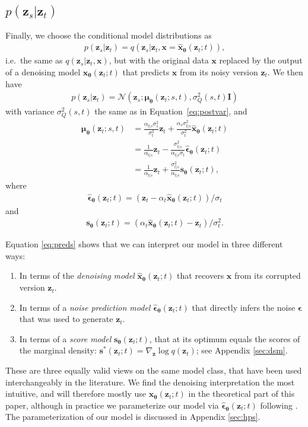 \documentclass{article}
\def\Eqref#1{Equation~\ref{#1}}
\def\rvx{{\mathbf{x}}}
\def\rvz{{\mathbf{z}}}
\newcommand{\bT}{{\boldsymbol{\theta}}}
\newcommand{\snT}{\mathbf{s}_{\bT}}
\newcommand{\bfI}{\mathbf{I}}
\newcommand{\bepsilon}{{\boldsymbol{\epsilon}}}
\newcommand{\bmu}{{\boldsymbol{\mu}}}
\begin{document}
\subsection{$p(\rvz_s|\rvz_t)$}
Finally, we choose the conditional model distributions as
\begin{align}
p(\rvz_s|\rvz_t) = q(\rvz_s|\rvz_t, \rvx=\hat{\rvx}_{\bT}(\rvz_t; t)),
\label{eq:zs_given_zt_model}
\end{align}
i.e.\ the same as $q(\rvz_s|\rvz_t,\mathbf{x})$, but with the original data $\rvx$ replaced by the output of a denoising model $\hat{\rvx}_{\bT}(\rvz_t; t)$ that predicts $\rvx$ from its noisy version $\rvz_t$. We then have
\begin{align}
p(\rvz_s|\rvz_t) = \mathcal{N}(\rvz_s; \bmu_{\bT}(\rvz_{t}; s, t), \sigma^2_Q(s,t) \bfI)
\end{align}
with variance $\sigma^2_Q(s,t)$ the same as in \Eqref{eq:postvar}, and 
\begin{align}
\bmu_{\bT}(\rvz_t; s, t) 
&= \frac{\alpha_{t|s}\sigma^{2}_s}{\sigma^{2}_t}\rvz_{t} + \frac{\alpha_s \sigma^{2}_{t|s}}{\sigma^{2}_{t}}\hat{\rvx}_{\bT}(\rvz_t; t) \nonumber\\
&= \frac{1}{\alpha_{t|s}}\rvz_{t} - \frac{\sigma^{2}_{t|s}}{\alpha_{t|s}\sigma_{t}}\hat{\bepsilon}_{\bT}(\rvz_t; t) \nonumber\\
&= \frac{1}{\alpha_{t|s}}\rvz_t + \frac{\sigma^2_{t|s}}{\alpha_{t|s}} \snT(\rvz_t;t), \label{eq:preds}
\end{align}
where
\begin{align}
\hat{\bepsilon}_{\bT}(\rvz_t; t) = (\rvz_t - \alpha_t\hat{\rvx}_{\bT}(\rvz_t; t))/\sigma_t
\end{align}
and
\begin{align}
\snT(\rvz_t;t) = (\alpha_t\hat{\rvx}_{\bT}(\rvz_t; t) - \rvz_t)/\sigma^{2}_t.
\end{align}



Equation \ref{eq:preds} shows that we can interpret our model in three different ways: 
\begin{enumerate}
\item In terms of the \emph{denoising model} $\hat{\rvx}_{\bT}(\rvz_t; t)$ that recovers $\rvx$ from its corrupted version $\rvz_t$.
\item In terms of a \emph{noise prediction model} $\hat{\bepsilon}_{\bT}(\rvz_t; t)$ that directly infers the noise $\bepsilon$ that was used to generate $\rvz_t$.
\item In terms of a \emph{score model} $\snT(\rvz_t;t)$, that at its optimum equals the scores of the marginal density: $\mathbf{s}^*(\rvz_t;t) = \nabla_{\rvz} \log q(\rvz_t)$; see Appendix \ref{sec:dsm}.
\end{enumerate}
These are three equally valid views on the same model class, that have been used interchangeably in the literature. We find the denoising interpretation the most intuitive, and will therefore mostly use $\hat{\rvx}_{\bT}(\rvz_t; t)$ in the theoretical part of this paper, although in practice we parameterize our model via $\hat{\bepsilon}_{\bT}(\rvz_t; t)$ following \cite{ho2020denoising}. The parameterization of our model is discussed in Appendix \ref{sec:hps}.
\end{document}

